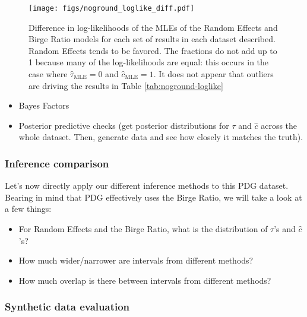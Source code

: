 \documentclass[12pt]{article}
\begin{document}
\begin{figure}
  \centering
  \texttt{[image: figs/noground\_loglike\_diff.pdf]}
  \caption{Difference in log-likelihoods of the MLEs of the Random Effects and Birge Ratio models for each set of results in each dataset described. Random Effects tends to be favored. The fractions do not add up to 1 because many of the log-likelihoods are equal: this occurs in the case where $\hat\tau_{\mathrm{MLE}}=0$ and $\hat{c}_{\mathrm{MLE}}=1$. It does not appear that outliers are driving the results in Table \ref{tab:noground-loglike}}
  \label{fig:noground-loglike}
\end{figure}




\begin{itemize}

\item
  Bayes Factors
\item
  Posterior predictive checks (get posterior distributions for $\tau$ and $\hat{c}$ across the whole dataset. Then, generate data and see how closely it matches the truth).
\end{itemize}

\subsubsection{Inference comparison}\label{inference-comparison}

Let's now directly apply our different inference methods to this PDG dataset. Bearing in mind that PDG effectively uses the Birge Ratio, we will take a look at a few things:

\begin{itemize}

\item
  For Random Effects and the Birge Ratio, what is the distribution of $\tau$'s and $\hat c$'s?
\item
  How much wider/narrower are intervals from different methods?
\item
  How much overlap is there between intervals from different methods?
\end{itemize}

\subsubsection{Synthetic data evaluation}\label{synthetic-data-evaluation}
\end{document}

